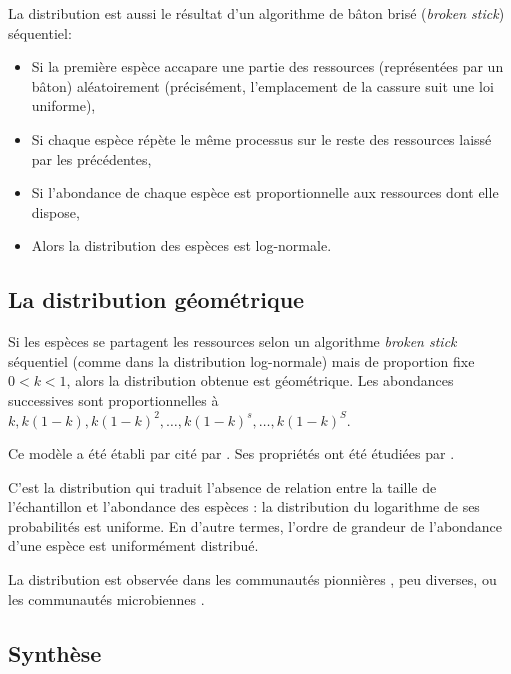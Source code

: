 \documentclass[
  11pt,
  french,
  a4paper,
  extrafontsizes,onecolumn,openright
  ]{memoir}
\providecommand{\tightlist}{%
  \setlength{\itemsep}{0pt}\setlength{\parskip}{0pt}}
\begin{document}
La distribution est aussi le résultat d'un algorithme de bâton brisé (\emph{broken stick}) séquentiel:

\begin{itemize}
\tightlist
\item
  Si la première espèce accapare une partie des ressources (représentées par un bâton) aléatoirement (précisément, l'emplacement de la cassure suit une loi uniforme),
\item
  Si chaque espèce répète le même processus sur le reste des ressources laissé par les précédentes,
\item
  Si l'abondance de chaque espèce est proportionnelle aux ressources dont elle dispose,
\item
  Alors la distribution des espèces est log-normale.
\end{itemize}

\hypertarget{la-distribution-guxe9omuxe9trique}{%
\subsection{La distribution géométrique}\label{la-distribution-guxe9omuxe9trique}}

Si les espèces se partagent les ressources selon un algorithme \emph{broken stick} séquentiel (comme dans la distribution log-normale) mais de proportion fixe \(0<k<1\), alors la distribution obtenue est géométrique.
Les abondances successives sont proportionnelles à \(k, k(1-k), k(1-k)^2, \dots, k(1-k)^s, \dots, k(1-k)^S\).

Ce modèle a été établi par \textcite{Motomura1932} cité par \textcite{May1975}.
Ses propriétés ont été étudiées par \textcite{Whittaker1972}.

C'est la distribution qui traduit l'absence de relation entre la taille de l'échantillon et l'abondance des espèces \autocite{Pueyo2007}: la distribution du logarithme de ses probabilités est uniforme.
En d'autre termes, l'ordre de grandeur de l'abondance d'une espèce est uniformément distribué.

La distribution est observée dans les communautés pionnières \autocite{Bazzaz1975}, peu diverses, ou les communautés microbiennes \autocite{Haegeman2013}.

\hypertarget{synthuxe8se}{%
\subsection{Synthèse}\label{synthuxe8se}}
\end{document}
